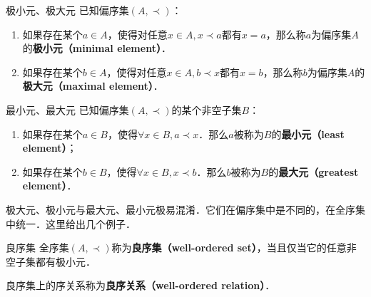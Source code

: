 \begin{definition}{极小元、极大元}
已知偏序集$(A,\prec)$：
\begin{enumerate}
\item 如果存在某个$a \in A$，使得对任意$x \in A, x\prec a$都有$x = a$，那么称$a$为偏序集$A$的\textbf{极小元（minimal element）}．
\item 如果存在某个$b \in A$，使得对任意$x \in A, b\prec x$都有$x = b$，那么称$b$为偏序集$A$的\textbf{极大元（maximal element）}．
\end{enumerate}
\end{definition}

\begin{definition}{最小元、最大元}
已知偏序集$(A,\prec)$的某个非空子集$B$：
\begin{enumerate}
\item 如果存在某个$a \in B$，使得$\forall x \in B, a \prec x$．那么$a$被称为$B$的\textbf{最小元（least element）}；
\item 如果存在某个$b \in B$，使得$\forall x \in B, x \prec b$．那么$b$被称为$B$的\textbf{最大元（greatest element）}．
\end{enumerate}
\end{definition}

极大元、极小元与最大元、最小元极易混淆．它们在偏序集中是不同的，在全序集中统一．这里给出几个例子．

\begin{example}{}

\end{example}

\begin{definition}{良序集}
全序集$(A,\prec)$称为\textbf{良序集（well-ordered set）}，当且仅当它的任意非空子集都有极小元．
\end{definition}

良序集上的序关系称为\textbf{良序关系（well-ordered relation）}．